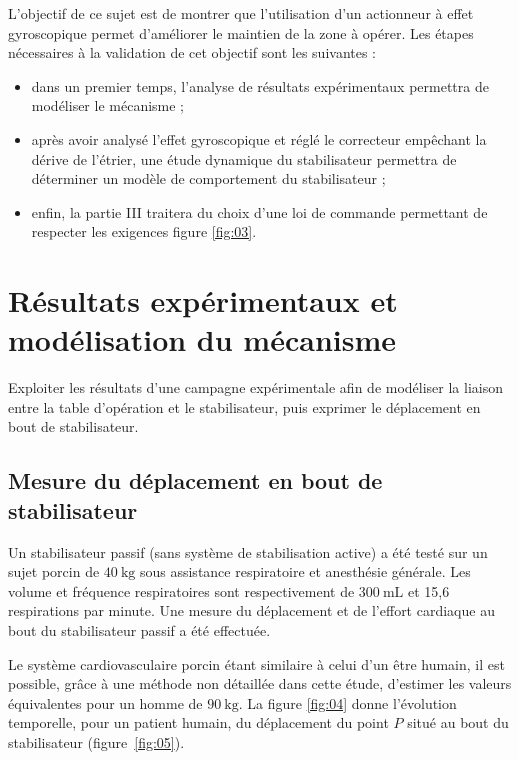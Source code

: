 \begin{obj}
L'objectif de ce sujet est de montrer que l'utilisation d'un actionneur à effet gyroscopique permet d'améliorer le maintien de la zone à opérer. Les étapes nécessaires à la validation de cet objectif sont les suivantes :
\end{obj}

\begin{itemize}
  \item dans un premier temps, l'analyse de résultats expérimentaux permettra de modéliser le mécanisme ;

  \item après avoir analysé l'effet gyroscopique et réglé le correcteur empêchant la dérive de l'étrier, une étude dynamique du stabilisateur permettra de déterminer un modèle de comportement du stabilisateur ;

  \item enfin, la partie III traitera du choix d'une loi de commande permettant de respecter les exigences figure \ref{fig:03}.

\end{itemize}

\section{Résultats expérimentaux et modélisation du mécanisme}
\begin{obj}
Exploiter les résultats d'une campagne expérimentale afin de modéliser la liaison entre la table d'opération et le stabilisateur, puis exprimer le déplacement en bout de stabilisateur.
\end{obj}

\subsection{\label{sec:I.A} Mesure du déplacement en bout de stabilisateur}
Un stabilisateur passif (sans système de stabilisation active) a été testé sur un sujet porcin de $40 \mathrm{~kg}$ sous assistance respiratoire et anesthésie générale. Les volume et fréquence respiratoires sont respectivement de $300 \mathrm{~mL}$ et 15,6 respirations par minute. Une mesure du déplacement et de l'effort cardiaque au bout du stabilisateur passif a été effectuée.

Le système cardiovasculaire porcin étant similaire à celui d'un être humain, il est possible, grâce à une méthode non détaillée dans cette étude, d'estimer les valeurs équivalentes pour un homme de $90 \mathrm{~kg}$. La figure \ref{fig:04} donne l'évolution temporelle, pour un patient humain, du déplacement du point $P$ situé au bout du stabilisateur (figure~\ref{fig:05}).

